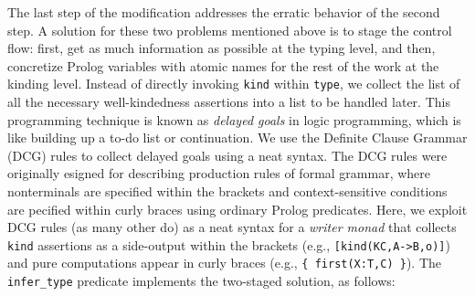 \documentclass[runningheads,a4paper]{llncs}
\begin{document}
The last step of the modification addresses the erratic behavior of
the second step. A solution for these two problems mentioned above is
to stage the control flow: first, get as much information as possible
at the typing level, and then, concretize Prolog variables with atomic names
for the rest of the work at the kinding level. Instead of directly invoking
\verb|kind| within \verb|type|, we collect the list of all the necessary
well-kindedness assertions into a list to be handled later.
This programming technique is known as \emph{delayed goals}
in logic programming, which is like building up a to-do list or continuation.
We use the Definite Clause Grammar (DCG) rules %
to collect delayed goals using a neat syntax. The DCG rules were originally
esigned for describing production rules of formal grammar, where nonterminals
are specified within the brackets and context-sensitive conditions are
pecified within curly braces using ordinary Prolog predicates. Here,
we exploit DCG rules (as many other do) as a neat syntax for
a \emph{writer monad} that collects \texttt{kind} assertions
as a side-output within the brackets (e.g., \verb|[kind(KC,A->B,o)]|) and pure
computations appear in curly braces (e.g., \verb|{ first(X:T,C) }|).
The \verb|infer_type| predicate implements the two-staged solution,
as follows:\vspace{-.5ex}
\end{document}
